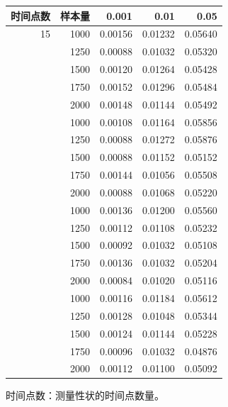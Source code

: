 \begin{table}[htbp]
\centering
{}
\label{tab:ch03-02}
\begin{tabular}{rrrrr}
\toprule
时间点数 & 样本量 & 0.001 & 0.01 & 0.05\\
\midrule
15 & 1000 & 0.00156 & 0.01232 & 0.05640\\
 & 1250 & 0.00088 & 0.01032 & 0.05320\\
 & 1500 & 0.00120 & 0.01264 & 0.05428\\
 & 1750 & 0.00152 & 0.01296 & 0.05484\\
 & 2000 & 0.00148 & 0.01144 & 0.05492\\
\addlinespace
20 & 1000 & 0.00108 & 0.01164 & 0.05856\\
 & 1250 & 0.00088 & 0.01272 & 0.05876\\
 & 1500 & 0.00088 & 0.01152 & 0.05152\\
 & 1750 & 0.00144 & 0.01056 & 0.05508\\
 & 2000 & 0.00088 & 0.01068 & 0.05220\\
\addlinespace
30 & 1000 & 0.00136 & 0.01200 & 0.05560\\
 & 1250 & 0.00112 & 0.01108 & 0.05232\\
 & 1500 & 0.00092 & 0.01032 & 0.05108\\
 & 1750 & 0.00136 & 0.01032 & 0.05204\\
 & 2000 & 0.00084 & 0.01020 & 0.05116\\
\addlinespace
40 & 1000 & 0.00116 & 0.01184 & 0.05612\\
 & 1250 & 0.00128 & 0.01048 & 0.05344\\
 & 1500 & 0.00124 & 0.01144 & 0.05228\\
 & 1750 & 0.00096 & 0.01032 & 0.04876\\
 & 2000 & 0.00112 & 0.01100 & 0.05092\\
\bottomrule
\end{tabular}
\par\smallskip
\begin{minipage}{0.8\textwidth}\footnotesize
时间点数：测量性状的时间点数量。
\end{minipage}
\end{table}
